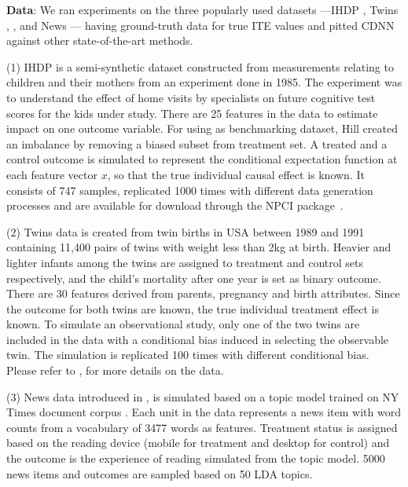 \documentclass[sigconf]{acmart}
\newcommand{\eat}[1]{}
\theoremstyle{plain}
\numberwithin{equation}{section}
\begin{document}
\textbf{Data}: We ran experiments on the three popularly used datasets ---IHDP \cite{ihdpHill}, Twins \cite{GANITE}, \cite{twinDataNBER}, and News \cite{learningRepresentations}--- having ground-truth data for true ITE values and pitted CDNN against other state-of-the-art methods. 

(1) IHDP is a semi-synthetic dataset constructed from measurements relating to children and their mothers from an experiment done in 1985. The experiment was to understand the effect of home visits by specialists on future cognitive test scores for the kids under study. There are 25 features in the data to estimate impact on one outcome variable. For using as benchmarking dataset, Hill \cite{ihdpHill} created an imbalance by removing a biased subset from treatment set. A treated and a control outcome is simulated to represent the conditional expectation function at each feature vector $x$, so that the true individual causal effect is known. \eat{The factual and counter-factual outcomes are created from the conditional treated and control outcome by adding an error term.}It consists of 747 samples, replicated 1000 times with different data generation processes and are available for download through the NPCI package~\cite{NPCI}. 

(2) Twins data is created from twin births in USA between 1989 and 1991~\cite{twinDataNBER} containing 11,400 pairs of twins with weight less than 2kg at birth. Heavier and lighter infants among the twins are assigned to treatment and control sets respectively, and the child's mortality after one year is set as binary outcome. There are 30 features derived from parents, pregnancy and birth attributes. Since the outcome for both twins are known, the true individual treatment effect is known. To simulate an observational study, only one of the two twins are included in the data with a conditional bias induced in selecting the observable twin. The simulation is replicated 100 times with different conditional bias. Please refer to \cite{GANITE}, \cite{twinDataNBER} for more details on the data. \eat{We process the data following the steps outlined in~\cite{GANITE} and request the reader to refer to it for more details.}

(3) News data introduced in \cite{learningRepresentations}, is simulated based on a topic model trained on NY Times document corpus \cite{NewsDataRepoUCI}. Each unit in the data represents a news item with word counts from a vocabulary of 3477 words as features. Treatment status is assigned based on the reading device (mobile for treatment and desktop for control) and the outcome is the experience of reading simulated from the topic model. 5000 news items and outcomes are sampled based on 50 LDA topics.
\end{document}
